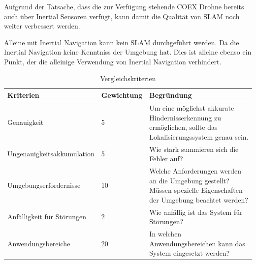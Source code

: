 Aufgrund der Tatsache, dass die zur Verfügung stehende COEX Drohne bereits auch über Inertial Sensoren verfügt, kann damit die Qualität von \ac{SLAM} noch weiter verbessert werden.

Alleine mit Inertial Navigation kann kein \ac{SLAM} durchgeführt werden. Da die Inertial Navigation keine Kenntniss der Umgebung hat. Dies ist alleine ebenso ein Punkt, der die alleinige Verwendung von Inertial Navigation verhindert.

\begin{table}[H]
    \centering
    \begin{tabular}{|p{5cm}|p{5cm}|p{5cm}|}
        \hline
        \textbf{Kriterien} & \textbf{Gewichtung} & \textbf{Begründung} \\
        \hline
        Genauigkeit & 5 & Um eine möglichst akkurate Hindernisserkennung zu ermöglichen, sollte das Lokalisierungssystem genau sein. \\
        \hline
        Ungenauigkeitsakkumulation & 5 & Wie stark summieren sich die Fehler auf? \\
        \hline
        Umgebungserfordernisse & 10 & Welche Anforderungen werden an die Umgebung gestellt? Müssen spezielle Eigenschaften der Umgebung beachtet werden? \\
        \hline
        Anfälligkeit für Störungen & 2 & Wie anfällig ist das System für Störungen? \\
        \hline
        Anwendungsbereiche & 20 & In welchen Anwendungsbereichen kann das System eingesetzt werden? \\
        \hline
    \end{tabular}
    \caption{Vergleichskriterien}
    \label{tab:vergleich-kriterien}
\end{table}

